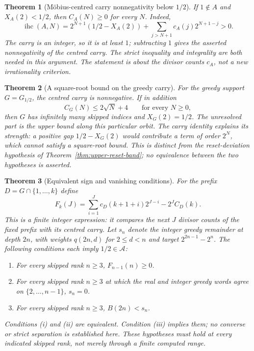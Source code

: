 \documentclass[11pt]{article}
\theoremstyle{plain}
\newtheorem{thm}{Theorem}[section]
\theoremstyle{definition}
\theoremstyle{remark}
\begin{document}
\begin{thm}[M\"obius-centred carry nonnegativity below $1/2$]
\label{thm:mobius-centred-nonneg}
If $1\notin A$ and $X_A(2)<1/2$, then $C_A(N)\ge0$ for every $N$.
Indeed,
\[
 \operatorname{ihc}(A,N)=2^{N+1}(1/2-X_A(2))+
 \sum_{j>N+1}c_A(j)2^{N+1-j}>0.
\]
The carry is an integer, so it is at least $1$; subtracting $1$ gives
the asserted nonnegativity of the centred carry.  The strict inequality
and integrality are both needed in this argument.  The statement is
about the divisor counts $c_A$, not a new irrationality criterion.
\end{thm}

\begin{thm}[A square-root bound on the greedy carry]
\label{thm:sqrt-bound-route}
For the greedy support $G=G_{1/2}$, the centred carry is nonnegative.
If in addition
\[
 C_G(N)\le2\sqrt N+4\qquad\text{for every }N\ge0,
\]
then $G$ has infinitely many skipped indices and $X_G(2)=1/2$.
The unresolved part is the upper bound along this particular orbit.
The carry identity explains its strength: a positive gap
$1/2-X_G(2)$ would contribute a term of order $2^N$, which cannot satisfy
a square-root bound.  This is distinct from the reset-deviation
hypothesis of Theorem~\ref{thm:upper-reset-band}; no equivalence between
the two hypotheses is asserted.
\end{thm}

\begin{thm}[Equivalent sign and vanishing conditions]
\label{thm:frozen-margin}
For the prefix $D=G\cap\{1,\ldots,k\}$ define
\[
 F_k(J)=\sum_{i=1}^{J}c_D(k+1+i)2^{J-i}-2^J C_D(k).
\]
This is a finite integer expression: it compares the next $J$ divisor
counts of the fixed prefix with its centred carry.  Let $s_n$ denote the
integer greedy remainder at depth $2n$, with weights $q(2n,d)$ for
$2\le d<n$ and target $2^{2n-1}-2^n$.
The following conditions each imply $1/2\in\mathcal A$:
\begin{enumerate}[label=(\roman*)]
\item For every skipped rank $n\ge3$, $F_{n-1}(n)\ge0$.
\item For every skipped rank $n\ge3$ at which the real and integer
      greedy words agree on $\{2,\ldots,n-1\}$, $s_n=0$.
\item For every skipped rank $n\ge3$, $B(2n)<s_n$.
\end{enumerate}
Conditions (i) and (ii) are equivalent.  Condition (iii) implies them;
no converse or strict separation is established here.  These hypotheses
must hold at every indicated skipped rank, not merely through a finite
computed range.
\end{thm}
\end{document}
